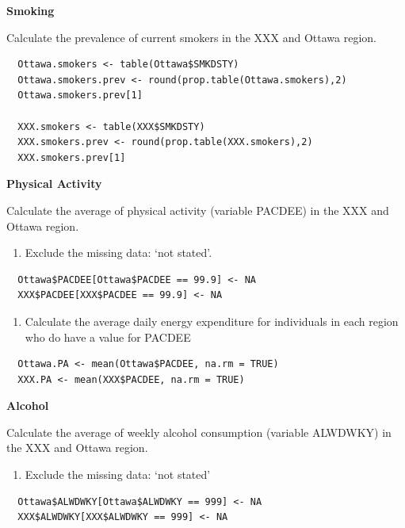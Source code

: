 \documentclass[]{book}
\providecommand{\tightlist}{%
  \setlength{\itemsep}{0pt}\setlength{\parskip}{0pt}}
\begin{document}
\textbf{Smoking}

Calculate the prevalence of current smokers in the XXX and Ottawa
region.

\begin{verbatim}
  Ottawa.smokers <- table(Ottawa$SMKDSTY)
  Ottawa.smokers.prev <- round(prop.table(Ottawa.smokers),2)
  Ottawa.smokers.prev[1]
  
  XXX.smokers <- table(XXX$SMKDSTY)
  XXX.smokers.prev <- round(prop.table(XXX.smokers),2)
  XXX.smokers.prev[1]
\end{verbatim}

\textbf{Physical Activity}

Calculate the average of physical activity (variable PACDEE) in the XXX
and Ottawa region.

\begin{enumerate}
\def\labelenumi{\alph{enumi}.}
\tightlist
\item
  Exclude the missing data: `not stated'.
\end{enumerate}

\begin{verbatim}
  Ottawa$PACDEE[Ottawa$PACDEE == 99.9] <- NA
  XXX$PACDEE[XXX$PACDEE == 99.9] <- NA
\end{verbatim}

\begin{enumerate}
\def\labelenumi{\alph{enumi}.}
\setcounter{enumi}{1}
\tightlist
\item
  Calculate the average daily energy expenditure for individuals in each
  region who do have a value for PACDEE
\end{enumerate}

\begin{verbatim}
  Ottawa.PA <- mean(Ottawa$PACDEE, na.rm = TRUE)
  XXX.PA <- mean(XXX$PACDEE, na.rm = TRUE)
\end{verbatim}

\textbf{Alcohol}

Calculate the average of weekly alcohol consumption (variable ALWDWKY)
in the XXX and Ottawa region.

\begin{enumerate}
\def\labelenumi{\alph{enumi}.}
\tightlist
\item
  Exclude the missing data: `not stated'
\end{enumerate}

\begin{verbatim}
  Ottawa$ALWDWKY[Ottawa$ALWDWKY == 999] <- NA
  XXX$ALWDWKY[XXX$ALWDWKY == 999] <- NA
\end{verbatim}
\end{document}
